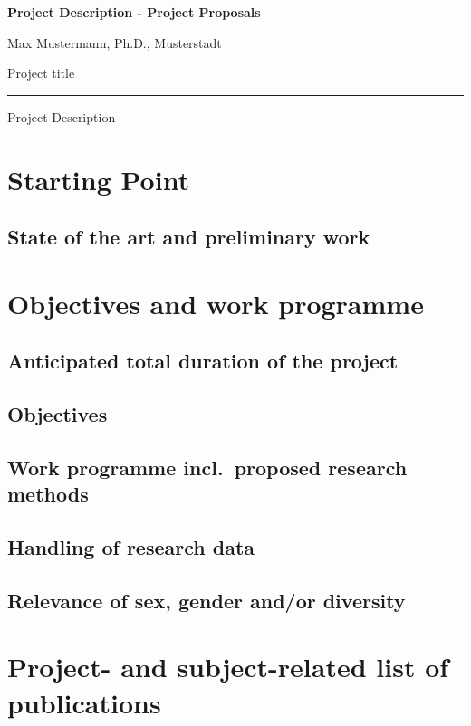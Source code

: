 \documentclass{scrartcl}
\newcommand{\applicants}{Max Mustermann, Ph.D., Musterstadt}
\newcommand{\project}{Project title}
\begin{document}
{\raggedright{} \normalsize \bfseries
	Project Description - Project Proposals \par
	\applicants{} \par
	\project{} \par
	\rule{\textwidth}{0.5pt} \par
	Project Description
}


\section{Starting Point}

\subsection*{State of the art and preliminary work}


\section{Objectives and work programme}

\subsection{Anticipated total duration of the project}

\subsection{Objectives}

\subsection{Work programme incl.\ proposed research methods}

\subsection{Handling of research data}

\subsection{Relevance of sex, gender and/or diversity}


\section{Project- and subject-related list of publications}

\printbibliography[heading=none]
\end{document}
